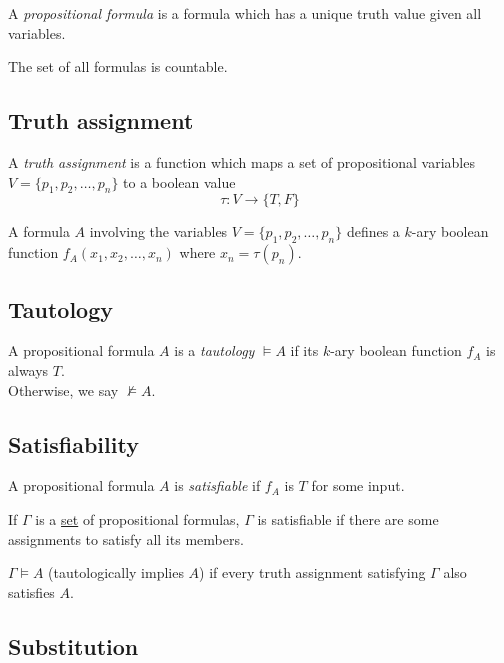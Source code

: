 \documentclass[a4paper]{article}
\begin{document}
A \textit{propositional formula} is a formula which has a unique truth value given all variables.

The set of all formulas is countable.

\subsection{Truth assignment}

A \textit{truth assignment} is a function which maps a set of propositional
variables \(V=\{p_1, p_2, \ldots, p_n\}\) to a boolean value
\[
    \tau: V \to \{T,F\}
\]

A formula \(A\) involving the variables \(V=\{p_1, p_2, \ldots, p_n\}\)
defines a \(k\)-ary boolean function \(f_A(x_1, x_2, \ldots, x_n)\) where \(x_n = \tau(p_n)\).



%
%
%
\subsection{Tautology}

A propositional formula \(A\) is a \textit{tautology} \(\vDash A\) if its \(k\)-ary boolean
function \(f_A\) is always \(T\). \\
Otherwise, we say \(\nvDash A\).

\subsection{Satisfiability}

A propositional formula \(A\) is \textit{satisfiable}
if \(f_A\) is \(T\) for some input.

If \(\Gamma\) is a \underline{set} of propositional formulas, \(\Gamma\)
is satisfiable if there are some assignments to satisfy all its members.

\(\Gamma \vDash A\) (tautologically implies \(A\))
if every truth assignment satisfying \(\Gamma\)
also satisfies \(A\).

\subsection{Substitution}
\end{document}
